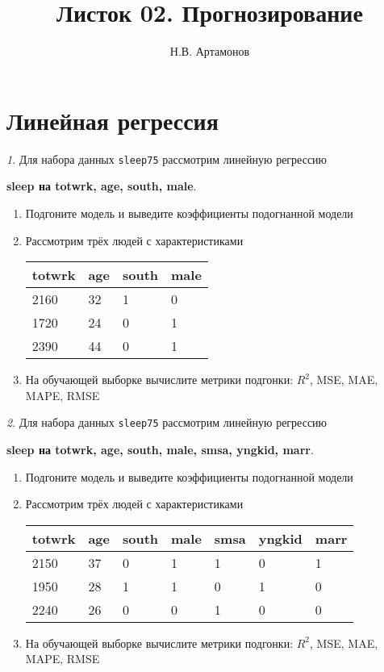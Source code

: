 \documentclass[12pt]{article}
\title{Листок 02. Прогнозирование}
\author{Н.В. Артамонов}
\theoremstyle{remark}
\newtheorem{exercise}{}[section]
\begin{document}
\maketitle

\tableofcontents

\section{Линейная регрессия}

\begin{exercise}
Для набора данных \texttt{sleep75} рассмотрим линейную регрессию 
\begin{center}
	\textbf{sleep на totwrk, age, south, male}.
\end{center}
\begin{enumerate}
	\item Подгоните модель и выведите коэффициенты подогнанной модели
	\item Рассмотрим трёх людей с характеристиками
	\begin{center}
		\begin{tabular}{|l|l|l|l|}\hline
			totwrk & age & south & male \\ \hline\hline
			2160 & 32 & 1 & 0 \\
			1720 & 24 & 0 & 1 \\
			2390 & 44 & 0 & 1 \\ \hline
		\end{tabular}
	\end{center}
	\item На обучающей выборке вычислите метрики подгонки: \(R^2\), 
	MSE, MAE, MAPE, RMSE
\end{enumerate}
\end{exercise}

\begin{exercise}
Для набора данных \texttt{sleep75} рассмотрим линейную регрессию 
\begin{center}
	\textbf{sleep на totwrk, age, south, male, smsa, yngkid, marr}.
\end{center}
\begin{enumerate}
	\item Подгоните модель и выведите коэффициенты подогнанной модели
	\item Рассмотрим трёх людей с характеристиками
	\begin{center}
		\begin{tabular}{|l|l|l|l|l|l|l|}\hline
			totwrk & age & south & male & smsa & yngkid & marr \\ \hline\hline
			2150 & 37 & 0 & 1 & 1 & 0 & 1 \\
			1950 & 28 & 1 & 1 & 0 & 1 & 0 \\
			2240 & 26 & 0 & 0 & 1 & 0 & 0 \\ \hline
		\end{tabular}
	\end{center}
	\item На обучающей выборке вычислите метрики подгонки: \(R^2\), 
	MSE, MAE, MAPE, RMSE
\end{enumerate}
\end{exercise}
\end{document}
